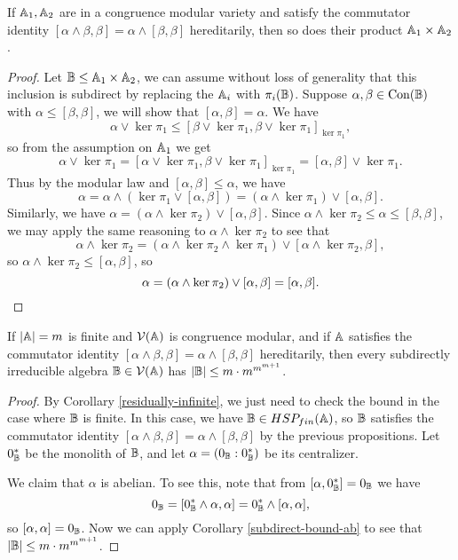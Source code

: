 \begin{appendices}
\begin{prop} If $\mathbb{A}_1,\mathbb{A}_2$ are in a congruence modular variety and satisfy the commutator identity $[\alpha\wedge \beta, \beta] = \alpha\wedge [\beta,\beta]$ hereditarily, then so does their product $\mathbb{A}_1 \times \mathbb{A}_2$.
\end{prop}
\begin{proof} Let $\mathbb{B} \le \mathbb{A}_1\times \mathbb{A}_2$, we can assume without loss of generality that this inclusion is subdirect by replacing the $\mathbb{A}_i$ with $\pi_i(\mathbb{B})$. Suppose $\alpha,\beta \in \operatorname{Con}(\mathbb{B})$ with $\alpha \le [\beta,\beta]$, we will show that $[\alpha,\beta] = \alpha$. We have
\[
\alpha \vee \ker\pi_1 \le [\beta\vee\ker\pi_1, \beta\vee\ker\pi_1]_{\ker \pi_1},
\]
so from the assumption on $\mathbb{A}_1$ we get
\[
\alpha \vee \ker \pi_1 = [\alpha \vee \ker\pi_1, \beta \vee \ker \pi_1]_{\ker \pi_1} = [\alpha,\beta]\vee \ker \pi_1.
\]
Thus by the modular law and $[\alpha,\beta] \le \alpha$, we have
\[
\alpha = \alpha\wedge (\ker \pi_1 \vee [\alpha,\beta]) = (\alpha \wedge \ker \pi_1) \vee [\alpha,\beta].
\]
Similarly, we have $\alpha = (\alpha \wedge \ker \pi_2) \vee [\alpha,\beta]$. Since $\alpha \wedge \ker \pi_2 \le \alpha \le [\beta,\beta]$, we may apply the same reasoning to $\alpha \wedge \ker \pi_2$ to see that
\[
\alpha \wedge \ker \pi_2 = (\alpha \wedge \ker \pi_2 \wedge \ker \pi_1) \vee [\alpha \wedge \ker \pi_2, \beta],
\]
so $\alpha \wedge \ker \pi_2 \le [\alpha,\beta]$, so
\[
\alpha = (\alpha \wedge \ker \pi_2) \vee [\alpha,\beta] = [\alpha,\beta].\qedhere
\]
\end{proof}

\begin{thm} If $|\mathbb{A}| = m$ is finite and $\mathcal{V}(\mathbb{A})$ is congruence modular, and if $\mathbb{A}$ satisfies the commutator identity $[\alpha \wedge \beta,\beta] = \alpha \wedge [\beta,\beta]$ hereditarily, then every subdirectly irreducible algebra $\mathbb{B} \in \mathcal{V}(\mathbb{A})$ has $|\mathbb{B}| \le m\cdot m^{m^{m+1}}$.
\end{thm}
\begin{proof} By Corollary \ref{residually-infinite}, we just need to check the bound in the case where $\mathbb{B}$ is finite. In this case, we have $\mathbb{B} \in HSP_{fin}(\mathbb{A})$, so $\mathbb{B}$ satisfies the commutator identity $[\alpha \wedge \beta,\beta] = \alpha \wedge [\beta,\beta]$ by the previous propositions. Let $0_{\mathbb{B}}^*$ be the monolith of $\mathbb{B}$, and let $\alpha = (0_{\mathbb{B}}:0_{\mathbb{B}}^*)$ be its centralizer.

We claim that $\alpha$ is abelian. To see this, note that from $[\alpha,0_{\mathbb{B}}^*] = 0_{\mathbb{B}}$ we have
\[
0_{\mathbb{B}} = [0_{\mathbb{B}}^*\wedge \alpha,\alpha] = 0_{\mathbb{B}}^*\wedge [\alpha,\alpha],
\]
so $[\alpha,\alpha] = 0_{\mathbb{B}}$. Now we can apply Corollary \ref{subdirect-bound-ab} to see that $|\mathbb{B}| \le m\cdot m^{m^{m+1}}$.%
\end{proof}


\end{appendices}
